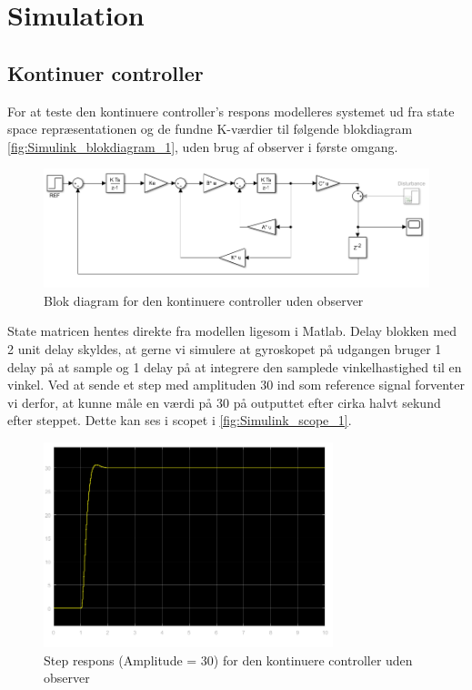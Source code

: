 \section{Simulation}
\subsection{Kontinuer controller}
For at teste den kontinuere controller's respons modelleres systemet ud fra state space repræsentationen og de fundne K-værdier til følgende blokdiagram \autoref{fig:Simulink_blokdiagram_1}, uden brug af observer i første omgang. 

\begin{figure}[H]
	\centering
	\includegraphics[width = 1\textwidth]{figur/Simulink_blokdiagram_1}
	\caption{Blok diagram for den kontinuere controller uden observer}
	\label{fig:Simulink_blokdiagram_1}
\end{figure}

State matricen hentes direkte fra modellen ligesom i Matlab. Delay blokken med 2 unit delay skyldes, at gerne vi simulere at gyroskopet på udgangen bruger 1 delay på at sample og 1 delay på at integrere den samplede vinkelhastighed til en vinkel. Ved at sende et step med amplituden 30 ind som reference signal forventer vi derfor, at kunne måle en værdi på 30 på outputtet efter cirka halvt sekund efter steppet. Dette kan ses i scopet i \autoref{fig:Simulink_scope_1}.

\begin{figure}[H]
	\centering
	\includegraphics[width = 0.75\textwidth]{figur/Simulink_scope_1}
	\caption{Step respons (Amplitude = 30) for den kontinuere controller uden observer}
	\label{fig:Simulink_scope_1}
\end{figure}

